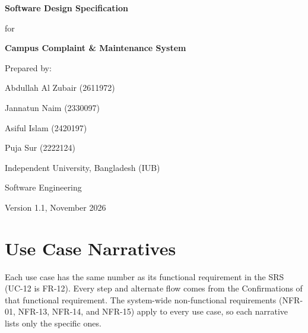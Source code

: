\documentclass[11pt,a4paper]{report}
\begin{document}
\begin{titlepage}
\centering
\vspace*{3cm}
{\LARGE\bfseries Software Design Specification\par}
\vspace{0.5cm}
{\Large for\par}
\vspace{0.5cm}
{\LARGE\bfseries Campus Complaint \& Maintenance System\par}
\vspace{2cm}
{\large Prepared by:\par}
\vspace{0.3cm}
Abdullah Al Zubair (2611972)\par
Jannatun Naim (2330097)\par
Asiful Islam (2420197)\par
Puja Sur (2222124)\par
\vspace{1.5cm}
Independent University, Bangladesh (IUB)\par
Software Engineering\par
\vspace{1cm}
Version 1.1, November 2026
\end{titlepage}

\tableofcontents

\chapter{Use Case Narratives}
Each use case has the same number as its functional requirement in the SRS (UC-12 is FR-12). Every step and alternate flow comes from the Confirmations of that functional requirement. The system-wide non-functional requirements (NFR-01, NFR-13, NFR-14, and NFR-15) apply to every use case, so each narrative lists only the specific ones.
\end{document}
